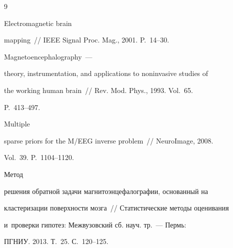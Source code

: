 {\small\frenchspacing

{%


\begin{thebibliography}{9}




 Electromagnetic brain

mapping~/\!\!/ IEEE Signal Proc. Mag., 2001. P.~14--30.






 Magnetoencephalography~---

theory, instrumentation, and applications to noninvasive studies of

the working human brain~/\!\!/ Rev. Mod. Phys., 1993. Vol.~65.

P.~413--497.








 Multiple

sparse priors for the M/EEG inverse problem~/\!\!/ NeuroImage, 2008.

Vol.~39. P.~1104--1120.




 Метод

решения обратной задачи магнитоэнцефалографии, основанный на

кластеризации поверхности мозга~/\!\!/ Статистические методы оценивания

и~проверки гипотез: Межвузовский сб. науч. тр.~--- Пермь:

ПГНИУ. 2013. Т.~25. С.~120--125.






\end{thebibliography}}}
